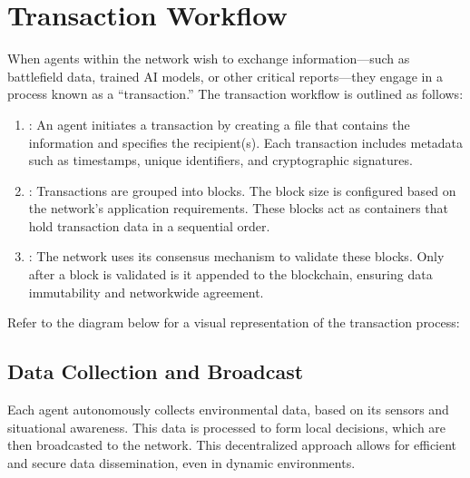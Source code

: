 \documentclass[a4paper,10pt,english]{sphinxmanual}
\let\sphinxpxdimen\pdfpxdimen\else\newdimen\sphinxpxdimen
\begin{document}
\section{Transaction Workflow}
\label{\detokenize{introduction:transaction-workflow}}
\sphinxAtStartPar
When agents within the network wish to exchange information—such as battlefield data, trained AI models, or other critical reports—they engage in a process known as a “transaction.” The transaction workflow is outlined as follows:
\begin{enumerate}
%
\item {} 
\sphinxAtStartPar
{}: An agent initiates a transaction by creating a file that contains the information and specifies the recipient(s). Each transaction includes metadata such as timestamps, unique identifiers, and cryptographic signatures.

\item {} 
\sphinxAtStartPar
{}: Transactions are grouped into blocks. The block size is configured based on the network’s application requirements. These blocks act as containers that hold transaction data in a sequential order.

\item {} 
\sphinxAtStartPar
{}: The network uses its consensus mechanism to validate these blocks. Only after a block is validated is it appended to the blockchain, ensuring data immutability and network\sphinxhyphen{}wide agreement.

\end{enumerate}

\sphinxAtStartPar
Refer to the diagram below for a visual representation of the transaction process:

\noindent{\hspace*{\fill}\sphinxincludegraphics[width=600\sphinxpxdimen]{{Transaction-process}.png}\hspace*{\fill}}


\subsection{Data Collection and Broadcast}
\label{\detokenize{introduction:data-collection-and-broadcast}}
\sphinxAtStartPar
Each agent autonomously collects environmental data, based on its sensors and situational awareness. This data is processed to form local decisions, which are then broadcasted to the network. This decentralized approach allows for efficient and secure data dissemination, even in dynamic environments.
\end{document}
